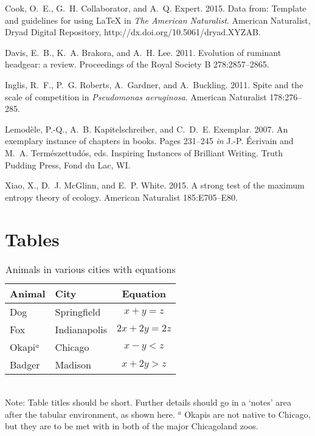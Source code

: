 \documentclass[11pt]{article}
\begin{document}
%
\begin{thebibliography}{}

Cook, O.~E., G.~H. Collaborator, and A.~Q. Expert. 2015.
\newblock Data from: Template and guidelines for using \LaTeX{} 
in \textit{The American Naturalist}.
\newblock American Naturalist, Dryad Digital Repository, 
http://dx.doi.org/10.5061/dryad.XYZAB.

Davis, E.~B., K.~A. Brakora, and A.~H. Lee. 2011.
\newblock Evolution of ruminant headgear: a review.
\newblock Proceedings of the Royal Society B 278:2857--2865.

Inglis, R.~F., P.~G. Roberts, A.~Gardner, and A.~Buckling. 2011.
\newblock Spite and the scale of competition in \textit{Pseudomonas
  aeruginosa}.
\newblock American Naturalist 178:276--285.

Lemod\`{e}le, P.-Q., A.~B. Kapitelschreiber, and C.~D.~E. Exemplar. 2007.
\newblock An exemplary instance of chapters in books.
\newblock Pages 231--245 \emph{in} J.-P. \'{E}crivain and M.~A. 
Term\'{e}szettud\'{o}s, eds. Inspiring Instances of Brilliant Writing. 
Truth Pudding Press, Fond du Lac, WI.

Xiao, X., D.~J. McGlinn, and E.~P. White. 2015.
\newblock A strong test of the maximum entropy theory of ecology.
\newblock American Naturalist 185:E705--E80.

\end{thebibliography}

\newpage{}

\section*{Tables}
\renewcommand{\thetable}{\arabic{table}}
\setcounter{table}{0}

\begin{table}[h]
\caption{Animals in various cities with equations}
\label{Table:Okapi}
\centering
\begin{tabular}{llc}\hline
Animal    & City         & Equation \\ \hline
Dog       & Springfield  & $x+y=z$ \\
Fox       & Indianapolis & $2x+2y=2z$ \\
Okapi$^a$ & Chicago      & $x-y<z$ \\
Badger    & Madison      & $x+2y>z$ \\ \hline
\end{tabular}
\bigskip{}
\\
{\footnotesize Note: Table titles should be short. Further details 
should go in a `notes' area after the tabular environment, as shown 
here. $^a$ Okapis are not native to Chicago, but they are to be met with 
in both of the major Chicagoland zoos.}
\end{table}
\end{document}
